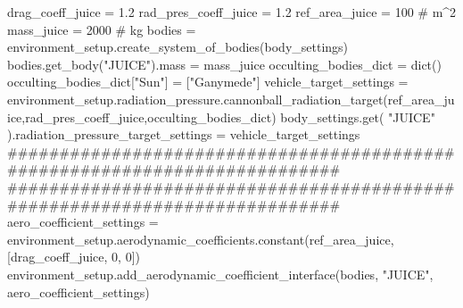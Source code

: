 {}
\markdownRendererSectionEnd \markdownRendererSectionBegin
{}\markdownRendererInterblockSeparator
{}
\markdownRendererSectionEnd \markdownRendererSectionBegin
{}\markdownRendererInterblockSeparator
{}drag_coeff_juice = 1.2 rad_pres_coeff_juice = 1.2 ref_area_juice = 100 # m^2 mass_juice = 2000 # kg\markdownRendererInterblockSeparator
{}
\markdownRendererSectionEnd \markdownRendererSectionBegin
{}\markdownRendererInterblockSeparator
{}bodies = environment_setup.create_system_of_bodies(body_settings) bodies.get_body("JUICE").mass = mass_juice occulting_bodies_dict = dict() occulting_bodies_dict["Sun"] = ["Ganymede"] vehicle_target_settings = environment_setup.radiation_pressure.cannonball_radiation_target(ref_area_juice,rad_pres_coeff_juice,occulting_bodies_dict)\markdownRendererInterblockSeparator
{}
\markdownRendererSectionEnd \markdownRendererSectionBegin
{}\markdownRendererInterblockSeparator
{}
\markdownRendererSectionEnd \markdownRendererSectionBegin
{}\markdownRendererInterblockSeparator
{}
\markdownRendererSectionEnd \markdownRendererSectionBegin
{}\markdownRendererInterblockSeparator
{}body_settings.get( "JUICE" ).radiation_pressure_target_settings = vehicle_target_settings\markdownRendererInterblockSeparator
{}###########################################################################\markdownRendererInterblockSeparator
{}
\markdownRendererSectionEnd \markdownRendererSectionBegin
{}\markdownRendererInterblockSeparator
{}###########################################################################\markdownRendererInterblockSeparator
{}
\markdownRendererSectionEnd \markdownRendererSectionBegin
{}\markdownRendererInterblockSeparator
{}aero_coefficient_settings = environment_setup.aerodynamic_coefficients.constant(ref_area_juice, [drag_coeff_juice, 0, 0]) environment_setup.add_aerodynamic_coefficient_interface(bodies, "JUICE", aero_coefficient_settings)\markdownRendererInterblockSeparator
{}
\markdownRendererSectionEnd \markdownRendererSectionBegin
